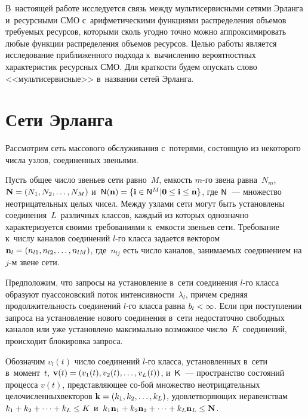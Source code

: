 \begin{multicols}{2}
В~настоящей работе исследуется 
связь \mbox{между} мультисервисными сетями Эрланга и~ресурсными СМО 
с~арифметическими функциями распределения объемов требуемых ресурсов, 
которыми сколь угодно точно можно аппроксимировать любые функции 
распределения объемов ресурсов. \mbox{Целью} работы является исследование 
приближенного подхода к~вычислению вероятностных характеристик 
ресурсных СМО. Для краткости будем опускать слово <<мультисервисные>> 
в~названии сетей Эрланга.

\section{Сети Эрланга}

  Рассмотрим сеть массового обслуживания с~потерями, состоящую из 
некоторого числа узлов, соединенных звеньями. 

Пусть общее число звеньев 
сети равно~$M$, емкость $m$-го звена равна~$N_m$, $\mathbf{N}\hm= (N_1, 
N_2, \ldots ,N_M)$ и~${\sf N}(\mathbf{n}) \hm= \{ \mathbf{i}\hm\in {\sf N}^M 
\vert \mathbf{0}\leq \mathbf{i}\leq \mathbf{n}\}$, где ${\sf N}$~--- множество 
неотрицательных целых чисел. Между узлами сети могут быть установлены 
соединения~$L$~различных классов, каждый из которых однозначно 
характеризуется своими требованиями к~емкости звеньев сети. Требование 
к~числу каналов соединений $l$-го класса задается вектором 
$\mathbf{n}_l\hm= (n_{l1}, n_{l2}, \ldots , n_{lM})$, где~$n_{lj}$ есть число 
каналов, занимаемых соединением на $j$-м звене сети. 

Предположим, что 
запросы на уста\-нов\-ле\-ние в~сети соединения $l$-го класса образуют 
пуассоновский поток интенсивности~$\lambda_l$, причем средняя 
продолжительность соединений $l$-го класса равна $b_l\hm<\infty$. Если при 
поступлении запроса на уста\-нов\-ле\-ние нового соединения в~сети недостаточно 
свободных каналов или уже установлено максимально возможное 
число~$K$~соединений, происходит блокировка запроса. 
  
  Обозначим $v_l(t)$ число соединений $l$-го класса, установленных в~сети 
в~момент~$t$, $\mathbf{v}(t)\hm= (v_1(t), v_2(t),\ldots , v_L(t))$, и~${\sf K}$~--- 
пространство состо\-яний процесса $v(t)$, представляющее со-\linebreak бой множество 
неотрицательных целочисленных\linebreak векторов $\mathbf{k}\hm= (k_1, k_2, \ldots , 
k_L)$, удовлетворяющих неравенствам $k_1\hm+k_2+\cdots + k_L\hm\leq K$ 
и~$k_1\mathbf{n}_1\hm+ k_2\mathbf{n}_2+\cdots + k_L\mathbf{n}_L\hm\leq 
\mathbf{N}$. 


\end{multicols}
